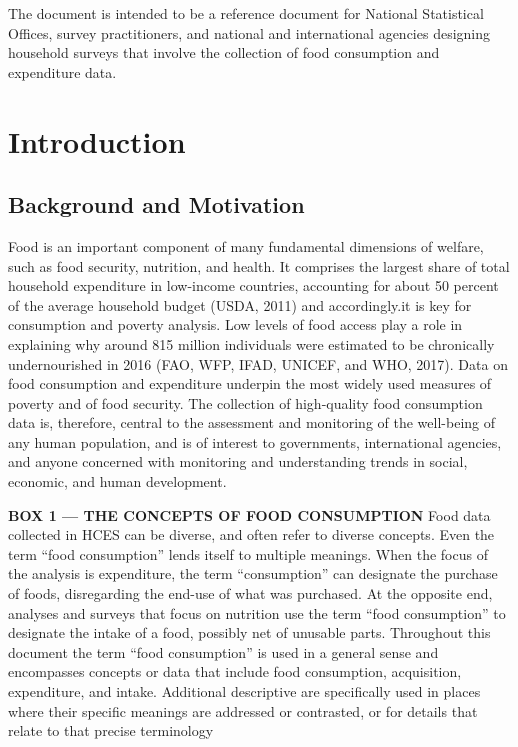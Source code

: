 \documentclass[
]{book}
\begin{document}
The document is intended to be a reference document for National Statistical Offices, survey practitioners, and national and
international agencies designing household surveys that involve the collection of food consumption and expenditure data.

\hypertarget{intro}{%
\chapter{Introduction}\label{intro}}

\hypertarget{background-and-motivation}{%
\section{Background and Motivation}\label{background-and-motivation}}

Food is an important component of many fundamental dimensions of welfare, such as food security, nutrition, and health. It comprises the largest share of total household expenditure in low-income countries, accounting for about 50 percent of the average household budget (USDA, 2011) and accordingly.it is key for consumption and poverty analysis. Low levels of food access play a role in explaining why around 815 million individuals were estimated to be chronically undernourished in 2016 (FAO, WFP, IFAD, UNICEF, and WHO, 2017). Data on food consumption and expenditure underpin the most widely used measures of poverty and of food security. The collection of high-quality food consumption data is, therefore, central to the assessment and monitoring of the well-being of any human population, and is of interest to governments, international agencies, and anyone concerned with monitoring and understanding trends in social, economic, and human development.

\textbf{BOX 1 --- THE CONCEPTS OF FOOD CONSUMPTION}
Food data collected in HCES can be diverse, and often refer to diverse concepts. Even the term ``food consumption'' lends itself to multiple meanings. When the focus of the analysis is expenditure, the term ``consumption'' can designate the purchase of foods, disregarding the end-use of what was purchased. At the opposite end, analyses and surveys that focus on nutrition use the term ``food consumption'' to designate the intake of a food, possibly net of unusable parts. Throughout this document the term ``food consumption'' is used in a general sense and encompasses concepts or data that include food consumption, acquisition, expenditure, and intake. Additional descriptive are specifically used in places where their specific meanings are addressed or contrasted, or for details that relate to that precise terminology
\end{document}
